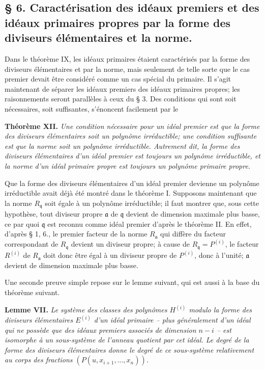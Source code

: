 \providecommand{\fraka}{\mathfrak a}
\providecommand{\frakm}{\mathfrak m}
\providecommand{\frakp}{\mathfrak p}
\providecommand{\frakq}{\mathfrak q}

\subsection*{\S{} 6. Caractérisation des idéaux premiers et des idéaux primaires propres par la forme des diviseurs élémentaires et la norme.}

Dans le théorème IX, les idéaux primaires étaient caractérisés par la forme des diviseurs élémentaires et par la norme, mais seulement de telle sorte que le cas premier devait être considéré comme un cas spécial du primaire. Il s'agit maintenant de séparer les idéaux premiers des idéaux primaires propres; les raisonnements seront parallèles à ceux du \S{} 3. Des conditions qui sont soit nécessaires, soit suffisantes, s'énoncent facilement par le

\textbf{Théorème XII.} \emph{Une condition nécessaire pour un idéal premier est que la forme des diviseurs élémentaires soit un polynôme irréductible; une condition suffisante est que la norme soit un polynôme irréductible. Autrement dit, la forme des diviseurs élémentaires d'un idéal premier est toujours un polynôme irréductible, et la norme d'un idéal primaire propre est toujours un polynôme primaire propre.}

Que la forme des diviseurs élémentaires d'un idéal premier devienne un polynôme irréductible avait déjà été montré dans le théorème I. Supposons maintenant que la norme $R_\frakq$ soit égale à un polynôme irréductible; il faut montrer que, sous cette hypothèse, tout diviseur propre $\fraka$ de $\frakq$ devient de dimension maximale plus basse, ce par quoi $\frakq$ est reconnu comme idéal premier d'après le théorème II. En effet, d'après \S{} 1, 6., le premier facteur de la norme $R_\fraka$ qui diffère du facteur correspondant de $R_\frakq$ devient un diviseur propre; à cause de $R_\frakq=P^{(i)}$, le facteur $R^{(i)}$ de $R_\fraka$ doit donc être égal à un diviseur propre de $P^{(i)}$, donc à l'unité; $\fraka$ devient de dimension maximale plus basse.

Une seconde preuve simple repose sur le lemme suivant, qui est aussi à la base du théorème suivant.

\textbf{Lemme VII.} \emph{Le système des classes des polynômes $H^{(i)}$ modulo la forme des diviseurs élémentaires $E^{(i)}$ d'un idéal primaire -- plus généralement d'un idéal qui ne possède que des idéaux premiers associés de dimension $n-i$ -- est isomorphe à un sous-système de l'anneau quotient par cet idéal. Le degré de la forme des diviseurs élémentaires donne le degré de ce sous-système relativement au corps des fractions $(P(u,x_{i+1},\ldots,x_n))$.}

